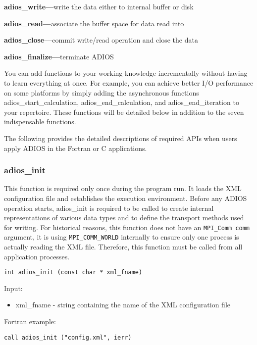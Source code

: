 \textbf{adios\_write---}write the data either to internal buffer or disk

\textbf{adios\_read---}associate the buffer space for data read into

\textbf{adios\_close---}commit write/read operation and close the data

\textbf{adios\_finalize---}terminate ADIOS

You can add functions to your working knowledge incrementally without having to 
learn everything at once. For example, you can achieve better I/O performance on 
some platforms by simply adding the asynchronous functions adios\_start\_calculation, 
adios\_end\_calculation, and adios\_end\_iteration to your repertoire. These functions 
will be detailed below in addition to the seven indispensable functions.

The following provides the detailed descriptions of required APIs when users apply 
ADIOS in the Fortran or C applications.

\subsubsection{adios\_init}

This function is required only once during the program run. 
It loads the XML configuration file 
and establishes the execution environment. Before any ADIOS operation starts, adios\_init 
is required to be called to create internal representations of various data types 
and to define the transport methods used for writing. 
For historical reasons, this function does not have an \verb+MPI_Comm comm+ 
argument, it is using \verb+MPI_COMM_WORLD+ internally to ensure only one process
is actually reading the XML file. Therefore, this function must be called from
all application processes. 

\begin{lstlisting}[alsolanguage=C]
int adios_init (const char * xml_fname)
\end{lstlisting}

Input: 
\begin{itemize}
\item xml\_fname - string containing the name of the XML configuration file
\end{itemize}

Fortran example: 
\begin{lstlisting}[alsolanguage=Fortran]
call adios_init ("config.xml", ierr)
\end{lstlisting}

